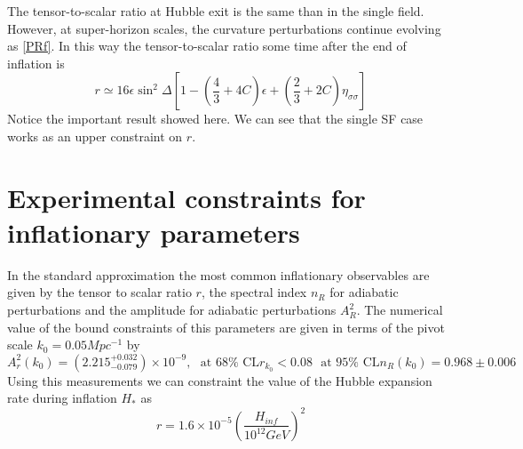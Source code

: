 \documentclass[amssymb,twocolumn,prd,nofootinbib,showpacs]{revtex4-1}
\begin{document}
The tensor-to-scalar ratio at Hubble exit is the same than in the single field. However, at super-horizon scales, the curvature perturbations continue evolving as \eqref{PRf}. In this way the tensor-to-scalar ratio some time after the end of inflation is
\begin{equation}\label{Tensortoscalar}
r\simeq 16\epsilon \sin^2\Delta\left[1-\left(\frac{4}{3}+4C\right)\epsilon +\left(\frac{2}{3}+2C\right)\eta_{\sigma\sigma}\right]
\end{equation}
Notice the important result showed here. We can see that the single SF case works as an upper constraint on $r$.
\section{Experimental constraints for inflationary parameters}

In the standard approximation the most common inflationary observables are given by the tensor to scalar ratio $r$, the spectral index $n_R$ for adiabatic perturbations and the amplitude for adiabatic perturbations $A_R^2$.  The numerical value of the bound constraints of this parameters are given in terms of the pivot scale $k_0=0.05 Mpc^{-1}$ by \cite{const1,const2,planck,const3,const4,const5}
\begin{subequations}
\begin{equation}\label{amplitude}
A_r^2(k_0)=(2.215^{+0.032}_{-0.079})\times 10^{-9}, \ \ \ \text{at $68\%$ CL}
\end{equation}
\begin{equation}
r_{k_0}<0.08 \ \ \ \text{at $95\%$ CL}
\end{equation}
\begin{equation}\label{n_R}
n_R(k_0)=0.968 \pm 0.006
\end{equation}
\end{subequations}
Using this measurements we can constraint the value of the Hubble expansion rate during inflation $H_*$ as \cite{H1,H2}
\begin{equation}\label{Hinf}
r = 1.6\times 10^{-5}\left(\frac{H_{inf}}{10^{12}GeV}\right)^2
\end{equation}
\end{document}

